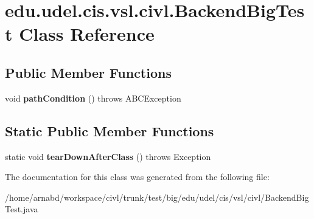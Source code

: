 \hypertarget{classedu_1_1udel_1_1cis_1_1vsl_1_1civl_1_1BackendBigTest}{}\section{edu.\+udel.\+cis.\+vsl.\+civl.\+Backend\+Big\+Test Class Reference}
\label{classedu_1_1udel_1_1cis_1_1vsl_1_1civl_1_1BackendBigTest}
\subsection*{Public Member Functions}
\begin{DoxyCompactItemize}
\item 
\hypertarget{classedu_1_1udel_1_1cis_1_1vsl_1_1civl_1_1BackendBigTest_aa719ae079567a972b5a0c45089ad2af7}{}void {\bfseries path\+Condition} ()  throws A\+B\+C\+Exception \label{classedu_1_1udel_1_1cis_1_1vsl_1_1civl_1_1BackendBigTest_aa719ae079567a972b5a0c45089ad2af7}

\end{DoxyCompactItemize}
\subsection*{Static Public Member Functions}
\begin{DoxyCompactItemize}
\item 
\hypertarget{classedu_1_1udel_1_1cis_1_1vsl_1_1civl_1_1BackendBigTest_a0b2b5e53c39918cd3e7f3cbf0ecbce28}{}static void {\bfseries tear\+Down\+After\+Class} ()  throws Exception \label{classedu_1_1udel_1_1cis_1_1vsl_1_1civl_1_1BackendBigTest_a0b2b5e53c39918cd3e7f3cbf0ecbce28}

\end{DoxyCompactItemize}


The documentation for this class was generated from the following file\+:\begin{DoxyCompactItemize}
\item 
/home/arnabd/workspace/civl/trunk/test/big/edu/udel/cis/vsl/civl/Backend\+Big\+Test.\+java\end{DoxyCompactItemize}
